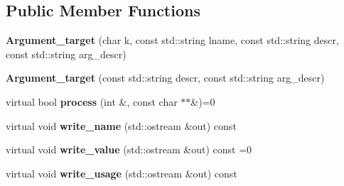 \subsection*{Public Member Functions}
\begin{DoxyCompactItemize}
\item 
\hypertarget{classdsr_1_1_argument__helper_1_1_argument__target_a18fa4db232e09c250726f6205d4ed46f}{
{\bfseries Argument\_\-target} (char k, const std::string lname, const std::string descr, const std::string arg\_\-descr)}
\label{classdsr_1_1_argument__helper_1_1_argument__target_a18fa4db232e09c250726f6205d4ed46f}

\item 
\hypertarget{classdsr_1_1_argument__helper_1_1_argument__target_a7f94fa839300ae7b11a785c2548635f5}{
{\bfseries Argument\_\-target} (const std::string descr, const std::string arg\_\-descr)}
\label{classdsr_1_1_argument__helper_1_1_argument__target_a7f94fa839300ae7b11a785c2548635f5}

\item 
\hypertarget{classdsr_1_1_argument__helper_1_1_argument__target_a4892e51b63fba18bbb0a562b48048340}{
virtual bool {\bfseries process} (int \&, const char $\ast$$\ast$\&)=0}
\label{classdsr_1_1_argument__helper_1_1_argument__target_a4892e51b63fba18bbb0a562b48048340}

\item 
\hypertarget{classdsr_1_1_argument__helper_1_1_argument__target_a3d4e24d28b68d7077caaec7af840ba65}{
virtual void {\bfseries write\_\-name} (std::ostream \&out) const }
\label{classdsr_1_1_argument__helper_1_1_argument__target_a3d4e24d28b68d7077caaec7af840ba65}

\item 
\hypertarget{classdsr_1_1_argument__helper_1_1_argument__target_a07b67b02d88b4db5cf6aef6bcca7d344}{
virtual void {\bfseries write\_\-value} (std::ostream \&out) const =0}
\label{classdsr_1_1_argument__helper_1_1_argument__target_a07b67b02d88b4db5cf6aef6bcca7d344}

\item 
\hypertarget{classdsr_1_1_argument__helper_1_1_argument__target_aed6a18e0271c428a3d6edd4e0a45455f}{
virtual void {\bfseries write\_\-usage} (std::ostream \&out) const }
\label{classdsr_1_1_argument__helper_1_1_argument__target_aed6a18e0271c428a3d6edd4e0a45455f}

\end{DoxyCompactItemize}
